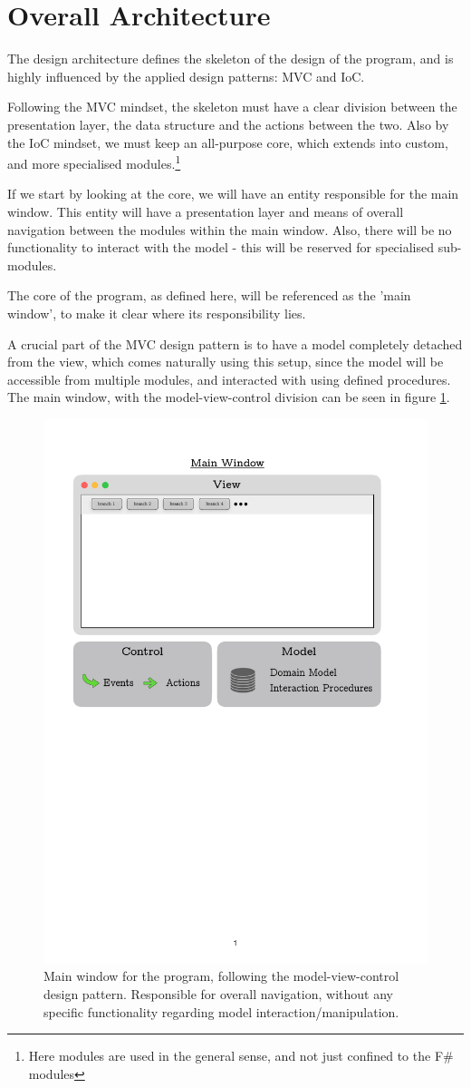 \section{Overall Architecture} \label{sec:Design-Architecture}

The design architecture defines the skeleton of the design of the program, and is highly influenced by the applied design patterns: MVC and IoC. 

Following the MVC mindset, the skeleton must have a clear division between the presentation layer, the data structure and the actions between the two. Also by the IoC mindset, we must keep an all-purpose core, which extends into custom, and more specialised modules.\footnote{Here modules are used in the general sense, and not just confined to the F\# modules}

If we start by looking at the core, we will have an entity responsible for the main window. This entity will have a presentation layer and means of overall navigation between the modules within the main window. Also, there will be no functionality to interact with the model - this will be reserved for specialised sub-modules. 

The core of the program, as defined here, will be referenced as the 'main window', to make it clear where its responsibility lies.

A crucial part of the MVC design pattern is to have a model completely detached from the view, which comes naturally using this setup, since the model will be accessible from multiple modules, and interacted with using defined procedures. The main window, with the model-view-control division can be seen in figure \ref{fig:Architecture-MainWindow}.

\begin{figure}[H]
    \centering
    \includegraphics[page = 1, width = 0.6\linewidth]{.Figures/Architecture.pdf}
    \caption{Main window for the program, following the model-view-control design pattern. Responsible for overall navigation, without any specific functionality regarding model interaction/manipulation.}
    \label{fig:Architecture-MainWindow}
\end{figure}

